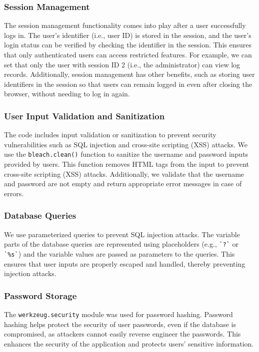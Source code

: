 \documentclass[journal]{IEEEtran}
\begin{document}
\subsubsection{Session Management}
The session management functionality comes into play after a user successfully logs in. The user's identifier (i.e., user ID) is stored in the session, and the user's login status can be verified by checking the identifier in the session. This ensures that only authenticated users can access restricted features. For example, we can set that only the user with session ID 2 (i.e., the administrator) can view log records. Additionally, session management has other benefits, such as storing user identifiers in the session so that users can remain logged in even after closing the browser, without needing to log in again.

\subsubsection{User Input Validation and Sanitization}
The code includes input validation or sanitization to prevent security vulnerabilities such as SQL injection and cross-site scripting (XSS) attacks. We use the \verb|bleach.clean()| function to sanitize the username and password inputs provided by users. This function removes HTML tags from the input to prevent cross-site scripting (XSS) attacks. Additionally, we validate that the username and password are not empty and return appropriate error messages in case of errors.

\subsubsection{Database Queries}
We use parameterized queries to prevent SQL injection attacks. The variable parts of the database queries are represented using placeholders (e.g., \verb|`?`| or \verb|`%s`|) and the variable values are passed as parameters to the queries. This ensures that user inputs are properly escaped and handled, thereby preventing injection attacks.

\subsubsection{Password Storage}
The \verb|werkzeug.security| module was used for password hashing. Password hashing helps protect the security of user passwords, even if the database is compromised, as attackers cannot easily reverse engineer the passwords. This enhances the security of the application and protects users' sensitive information.
\end{document}
